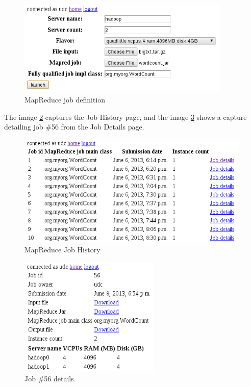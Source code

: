 \begin{figure}[bp]
\begin{center}
\includegraphics[width=0.90\textwidth]{imagenes/046.png}
\caption{MapReduce job definition}
\label{fig:defmapredjob}
\end{center}
\end{figure}

The image \ref{fig:mapredjobhistory} captures the Job History page, and the image \ref{fig:mapredjobdetails} shows a capture detailing job \#56 from the Job Details page.

\begin{figure}[tbp]
\begin{center}
\includegraphics[width=0.99\textwidth]{imagenes/047.png}
\caption{MapReduce Job History}
\label{fig:mapredjobhistory}
\end{center}
\end{figure}

\begin{figure}[tbp]
\begin{center}
\includegraphics[width=0.60\textwidth]{imagenes/048.png}
\caption{Job \#56 details}
\label{fig:mapredjobdetails}
\end{center}
\end{figure}

